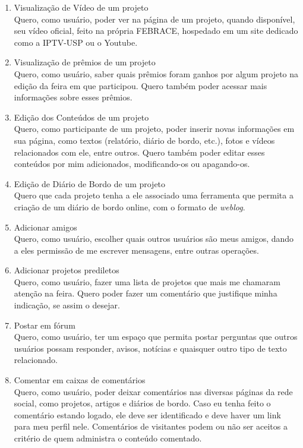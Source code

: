 \begin{enumerate}
    \item Visualização de Vídeo de um projeto \\
      Quero, como usuário, poder ver na página de um projeto, quando disponível, seu vídeo oficial, feito na própria FEBRACE, hospedado em um site dedicado como a IPTV-USP ou o Youtube.
    \item Visualização de prêmios de um projeto \\
      Quero, como usuário, saber quais prêmios foram ganhos por algum projeto na edição da feira em que participou. Quero também poder acessar mais informações sobre esses prêmios.
    \item Edição dos Conteúdos de um projeto \\
      Quero, como participante de um projeto, poder inserir novas informações em sua página, como textos (relatório, diário de bordo, etc.), fotos e vídeos relacionados com ele, entre outros. Quero também poder editar esses conteúdos por mim adicionados, modificando-os ou apagando-os.
    \item Edição de Diário de Bordo de um projeto \\
      Quero que cada projeto tenha a ele associado uma ferramenta que permita a criação de um diário de bordo online, com o formato de \textit{weblog}.
    \item Adicionar amigos \\
      Quero, como usuário, escolher quais outros usuários são meus amigos, dando a eles permissão de me escrever mensagens, entre outras operações.
    \item Adicionar projetos prediletos \\
      Quero, como usuário, fazer uma lista de projetos que mais me chamaram atenção na feira. Quero poder fazer um comentário que justifique minha indicação, se assim o desejar.
    \item Postar em fórum \\
      Quero, como usuário, ter um espaço que permita postar perguntas que outros usuários possam responder, avisos, notícias e quaisquer outro tipo de texto relacionado.
    \item Comentar em caixas de comentários \\
      Quero, como usuário, poder deixar comentários nas diversas páginas da rede social, como projetos, artigos e diários de bordo. Caso eu tenha feito o comentário estando logado, ele deve ser identificado e deve haver um link para meu perfil nele. Comentários de visitantes podem ou não ser aceitos a critério de quem administra o conteúdo comentado.

\end{enumerate}
